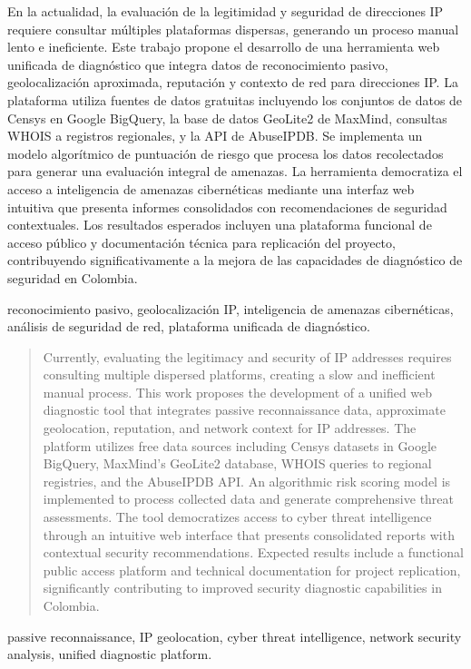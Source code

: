 \begin{resumen}
En la actualidad, la evaluación de la legitimidad y seguridad de direcciones IP requiere consultar múltiples plataformas dispersas, generando un proceso manual lento e ineficiente. Este trabajo propone el desarrollo de una herramienta web unificada de diagnóstico que integra datos de reconocimiento pasivo, geolocalización aproximada, reputación y contexto de red para direcciones IP. La plataforma utiliza fuentes de datos gratuitas incluyendo los conjuntos de datos de Censys en Google BigQuery, la base de datos GeoLite2 de MaxMind, consultas WHOIS a registros regionales, y la API de AbuseIPDB. Se implementa un modelo algorítmico de puntuación de riesgo que procesa los datos recolectados para generar una evaluación integral de amenazas. La herramienta democratiza el acceso a inteligencia de amenazas cibernéticas mediante una interfaz web intuitiva que presenta informes consolidados con recomendaciones de seguridad contextuales. Los resultados esperados incluyen una plataforma funcional de acceso público y documentación técnica para replicación del proyecto, contribuyendo significativamente a la mejora de las capacidades de diagnóstico de seguridad en Colombia.
\end{resumen}

\begin{palabrasclave}
reconocimiento pasivo, geolocalización IP, inteligencia de amenazas cibernéticas, análisis de seguridad de red, plataforma unificada de diagnóstico.
\end{palabrasclave}

\begin{abstract}
Currently, evaluating the legitimacy and security of IP addresses requires consulting multiple dispersed platforms, creating a slow and inefficient manual process. This work proposes the development of a unified web diagnostic tool that integrates passive reconnaissance data, approximate geolocation, reputation, and network context for IP addresses. The platform utilizes free data sources including Censys datasets in Google BigQuery, MaxMind's GeoLite2 database, WHOIS queries to regional registries, and the AbuseIPDB API. An algorithmic risk scoring model is implemented to process collected data and generate comprehensive threat assessments. The tool democratizes access to cyber threat intelligence through an intuitive web interface that presents consolidated reports with contextual security recommendations. Expected results include a functional public access platform and technical documentation for project replication, significantly contributing to improved security diagnostic capabilities in Colombia.
\end{abstract}

\begin{IEEEkeywords}
passive reconnaissance, IP geolocation, cyber threat intelligence, network security analysis, unified diagnostic platform.
\end{IEEEkeywords}
